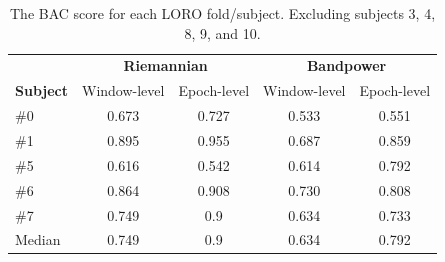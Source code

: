         \begin{table}[h]
            \centering
            \begin{tabular}{lcccc}
                \toprule
                & \multicolumn{2}{c}{\textbf{Riemannian}} & \multicolumn{2}{c}{\textbf{Bandpower}} \\
                \cmidrule(lr){2-3}
                \cmidrule(lr){4-5}
                \textbf{Subject} & Window-level & Epoch-level & Window-level & Epoch-level \\
                \midrule
                \#0 & 0.673 & 0.727 & 0.533 & 0.551 \\
                \#1 & 0.895 & 0.955 & 0.687 & 0.859 \\
                \#5 & 0.616 & 0.542 & 0.614 & 0.792 \\
                \#6 & 0.864 & 0.908 & 0.730 & 0.808 \\
                \#7 & 0.749 & 0.9   & 0.634 & 0.733 \\
                \midrule
                Median & 0.749 & 0.9 & 0.634 & 0.792 \\
                \bottomrule
            \end{tabular}
            \caption{The BAC score for each LORO fold/subject. Excluding subjects 3, 4, 8, 9, and 10.}\label{table:bac-selective}
        \end{table}

